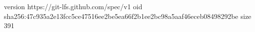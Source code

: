 version https://git-lfs.github.com/spec/v1
oid sha256:47c935a2e13fcc5ce47516ee2be5ea66f2b1ee2bc98a5aaf46eceb08498292be
size 391
